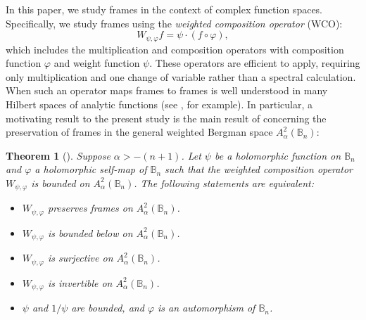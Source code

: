 \documentclass{amsart}
\newtheorem{thm}{Theorem}[section]
\theoremstyle{definition}
\theoremstyle{remark}
\numberwithin{equation}{section}
\begin{document}
In this paper, we study frames in the context of complex function spaces.  Specifically, we study frames using the  \emph{weighted composition operator} (WCO):
\begin{equation*}
    W_{\psi,\varphi}f = \psi \cdot (f\circ \varphi),
\end{equation*}
which includes the multiplication and composition operators with composition function $\varphi$ and weight function $\psi$. These operators are efficient to apply, requiring only multiplication and one change of variable rather than a spectral calculation. When such an operator maps frames to frames is well understood in many Hilbert spaces of analytic functions (see \cite{dong2024weighted,dong2024weighted2,manhas2019weighted,manhas2024fredholm}, for example). In particular, a motivating result to the present study is the main result of \cite{manhas2019weighted} concerning the preservation of frames in the general weighted Bergman space $A^{2}_{\alpha}(\mathbb{B}_{n})$: 
\begin{thm}[\cite{manhas2019weighted}]
    Suppose $\alpha>-(n+1)$. Let $\psi$ be a holomorphic function on $\mathbb{B}_{n}$ and $\varphi$ a holomorphic self-map of $\mathbb{B}_{n}$ such that the weighted composition operator $W_{\psi,\varphi}$ is bounded on $A^{2}_{\alpha}(\mathbb{B}_{n})$. The following statements are equivalent:
    \begin{itemize}
        \item[1.] $W_{\psi,\varphi}$ preserves frames on $A^{2}_{\alpha}(\mathbb{B}_{n})$. 
        \item[2.] $W_{\psi,\varphi}$ is bounded below on $A^{2}_{\alpha}(\mathbb{B}_{n})$.
        \item[3.] $W_{\psi,\varphi}$ is surjective on $A^{2}_{\alpha}(\mathbb{B}_{n})$.
        \item[4.] $W_{\psi,\varphi}$ is invertible on $A^{2}_{\alpha}(\mathbb{B}_{n})$.
        \item[5.] $\psi$ and $1/\psi$ are bounded, and $\varphi$ is an automorphism of $\mathbb{B}_{n}$. 
    \end{itemize}
\end{thm}
\end{document}
